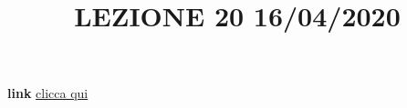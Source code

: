 \newline
\newline
\title{LEZIONE 20 16/04/2020}\newline
\textbf{link} \href{https://web.microsoftstream.com/video/ff7507f7-2f13-442a-bb05-e8f28e50c4de?list=user&userId=faa91214-a6f5-40d7-8875-253fd49b8ce1}{clicca qui}